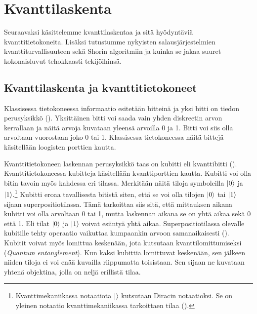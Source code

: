\chapter{Kvanttilaskenta}
Seuraavaksi käsittelemme kvanttilaskentaa ja sitä hyödyntäviä kvanttitietokoneita. Lisäksi tutustumme nykyisten salausjärjestelmien kvanttiturvallisuuteen sekä Shorin algoritmiin ja kuinka se jakaa suuret kokonaisluvut tehokkaasti tekijöihinsä.

\section{Kvanttilaskenta ja kvanttitietokoneet}
Klassisessa tietokoneessa informaatio esitetään bitteinä ja yksi bitti on tiedon perusyksikkö (\cite{doi:10.1080/23742917.2016.1226650}). Yksittäinen bitti voi saada vain yhden diskreetin arvon kerrallaan ja näitä arvoja kuvataan yleensä arvoilla 0 ja 1. Bitti voi siis olla arvoltaan vuorostaan joko 0 tai 1. Klassisessa tietokoneessa näitä bittejä käsitellään loogisten porttien kautta.

Kvanttitietokoneen laskennan perusyksikkö taas on kubitti eli kvanttibitti (\cite{doi:10.1080/23742917.2016.1226650}). Kvanttitietokoneessa kubitteja käsitellään kvanttiporttien kautta. Kubitti voi olla bitin tavoin myös kahdessa eri tilassa. Merkitään näitä tiloja symboleilla
$\ket{0}$ ja $\ket{1}$.\footnote{Kvanttimekaniikassa notaatiota $\ket{}$ kutsutaan Diracin notaatioksi. Se on yleinen notaatio kvanttimekaniikassa tarkoittaen tilaa (\cite{nielsen2001quantum}).} Kubitti eroaa tavallisesta bitistä siten, että se voi olla tilojen $\ket{0}$ tai $\ket{1}$ sijaan superpositiotilassa. Tämä tarkoittaa siis sitä, että mittauksen aikana kubitti voi olla arvoltaan 0 tai 1, mutta laskennan aikana se on yhtä aikaa sekä 0 että 1. Eli tilat $\ket{0}$ ja $\ket{1}$ voivat esiintyä yhtä aikaa. Superpositiotilassa olevalle kubitille tehty operaatio vaikuttaa kumpaankin arvoon samanaikaisesti (\cite{mavroeidis2018impact}). Kubitit voivat myös lomittua keskenään, jota kutsutaan kvanttilomittumiseksi (\emph{Quantum entanglement}). Kun kaksi kubittia lomittuvat keskenään, sen jälkeen niiden tiloja ei voi enää kuvailla riippumatta toisistaan. Sen sijaan ne kuvataan yhtenä objektina, jolla on neljä erillistä tilaa.

